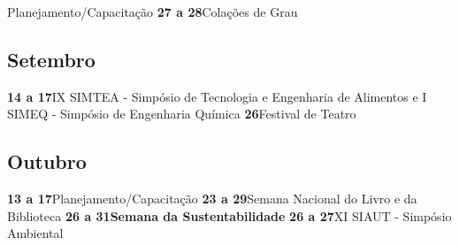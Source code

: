 \documentclass[thesis]{hmcposter}
\begin{document}
\begin{poster}
Planejamento/Capacitação \newline\textbf{27 a 28}\quad \quad Colações de Grau \newline\subsection{Setembro}\textbf{14 a 17}\quad \quad IX SIMTEA - Simpósio de Tecnologia e Engenharia de Alimentos  e I SIMEQ - Simpósio de Engenharia Química \newline\textbf{26}\quad \quad \quad \quad Festival de Teatro \newline\subsection{Outubro}\textbf{13 a 17}\quad \quad Planejamento/Capacitação \newline\textbf{23 a 29}\quad \quad  Semana Nacional do Livro e da Biblioteca \newline\textbf{26 a 31}\quad \quad \textbf{Semana da Sustentabilidade} \newline\textbf{26 a 27}\quad \quad XI SIAUT - Simpósio Ambiental \newline\end{poster}
\end{document}
